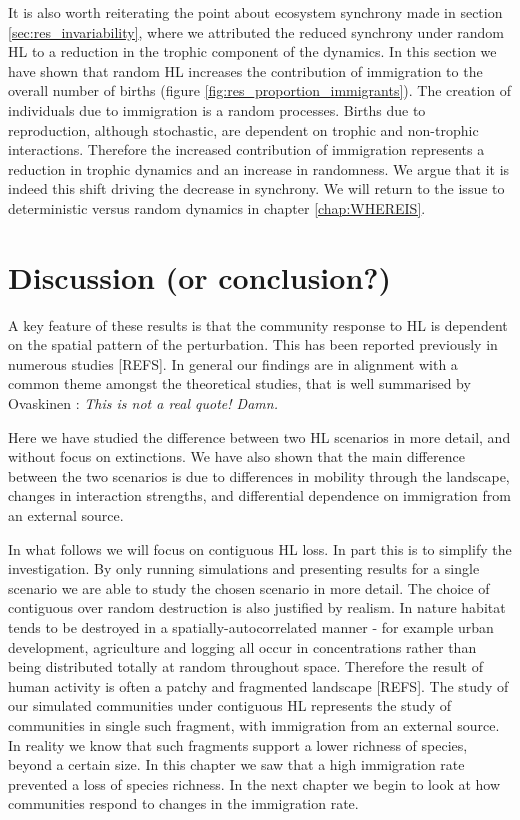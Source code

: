 It is also worth reiterating the point about ecosystem synchrony made in section \ref{sec:res_invariability}, where we attributed the reduced synchrony under random HL to a reduction in the trophic component of the dynamics. In this section we have shown that random HL increases the contribution of immigration to the overall number of births (figure \ref{fig:res_proportion_immigrants}). The creation of individuals due to immigration is a random processes. Births due to reproduction, although stochastic, are dependent on trophic and non-trophic interactions. Therefore the increased contribution of immigration represents a reduction in trophic dynamics and an increase in randomness. We argue that it is indeed this shift driving the decrease in synchrony. We will return to the issue to deterministic versus random dynamics in chapter \ref{chap:WHEREIS}.


\clearpage
\section{Discussion (or conclusion?)}
\label{sec:discussion}

A key feature of these results is that the community response to HL is dependent on the spatial pattern of the perturbation. This has been reported previously in numerous studies [REFS]. In general our findings are in alignment with a common theme amongst the theoretical studies, that is well summarised by Ovaskinen \cite{ovaskainen2002metapopulation}: \emph{This is not a real quote! Damn.}


Here we have studied the difference between two HL scenarios in more detail, and without focus on extinctions. We have also shown that the main difference between the two scenarios is due to differences in mobility through the landscape, changes in interaction strengths, and differential dependence on immigration from an external source. 

In what follows we will focus on contiguous HL loss. In part this is to simplify the investigation. By only running simulations and presenting results for a single scenario we are able to study the chosen scenario in more detail. The choice of contiguous over random destruction is also justified by realism. In nature habitat tends to be destroyed in a spatially-autocorrelated manner - for example urban development, agriculture and logging all occur in concentrations rather than being distributed totally at random throughout space. Therefore the result of human activity is often a patchy and fragmented landscape [REFS]. The study of our simulated communities under contiguous HL represents the study of communities in single such fragment, with immigration from an external source. In reality we know that such fragments support a lower richness of species, beyond a certain size. In this chapter we saw that a high immigration rate prevented a loss of species richness. In the next chapter we begin to look at how communities respond to changes in the immigration rate.


